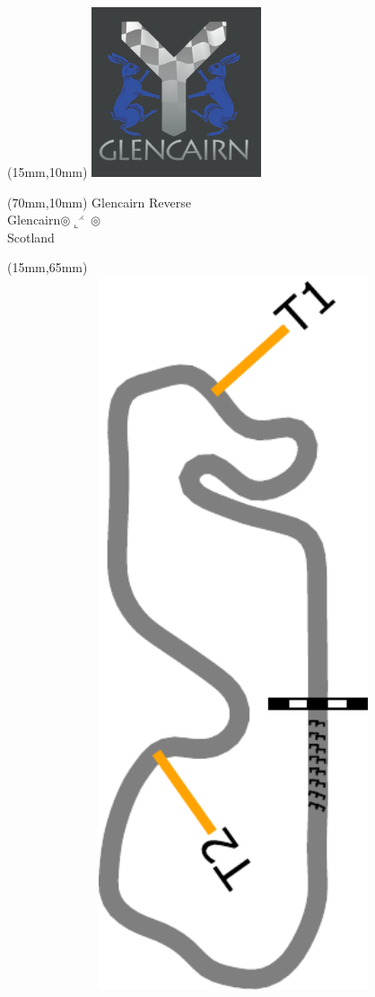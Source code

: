 \null\newpage
\begin{textblock*}{50mm}(15mm,10mm)%
\includegraphics[width=50mm]{LG/GLCN.png}
\end{textblock*}
\begin{textblock*}{130mm}(70mm,10mm)%
{\fontsize{20}{20}\selectfont Glencairn Reverse\\}
{\fontsize{16}{16}\selectfont Glencairn\hfill $\circledcirc\llcorner^{\rightthreetimes}\circledcirc$\\}
{\fontsize{12}{12}\selectfont Scotland\\}
\end{textblock*}
\begin{textblock*}{185mm}(15mm,65mm)%
\centering
\mbox{\includegraphics[width=185mm,height=210mm,keepaspectratio]{PT/GLCNR.pdf}}
\end{textblock*}
